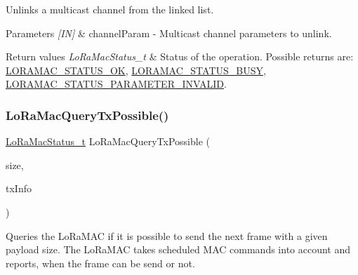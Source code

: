 Unlinks a multicast channel from the linked list.


\begin{DoxyParams}{Parameters}
{\em \mbox{[}\+I\+N\mbox{]}} & channel\+Param -\/ Multicast channel parameters to unlink.\\
\hline
\end{DoxyParams}

\begin{DoxyRetVals}{Return values}
{\em Lo\+Ra\+Mac\+Status\+\_\+t} & Status of the operation. Possible returns are\+: \hyperlink{group__LORAMAC_gga1d18f26b344040b3ec5c3db662919661a03db5fca052313edb3823c014b653a74}{L\+O\+R\+A\+M\+A\+C\+\_\+\+S\+T\+A\+T\+U\+S\+\_\+\+OK}, \hyperlink{group__LORAMAC_gga1d18f26b344040b3ec5c3db662919661a66b12f569207eacd97ee1c1d6c4cee6d}{L\+O\+R\+A\+M\+A\+C\+\_\+\+S\+T\+A\+T\+U\+S\+\_\+\+B\+U\+SY}, \hyperlink{group__LORAMAC_gga1d18f26b344040b3ec5c3db662919661ad0d3119f247d00e1787dda106fcb3017}{L\+O\+R\+A\+M\+A\+C\+\_\+\+S\+T\+A\+T\+U\+S\+\_\+\+P\+A\+R\+A\+M\+E\+T\+E\+R\+\_\+\+I\+N\+V\+A\+L\+ID}. \\
\hline
\end{DoxyRetVals}
\mbox{\label{group__LORAMAC_ga8b0aeaf75f9404ce01da9b202252c231}} 
\subsubsection{\texorpdfstring{Lo\+Ra\+Mac\+Query\+Tx\+Possible()}{LoRaMacQueryTxPossible()}}
{\footnotesize\ttfamily \hyperlink{group__LORAMAC_ga30bd25657e10480f8605ee951b0ecfbd}{Lo\+Ra\+Mac\+Status\+\_\+t} Lo\+Ra\+Mac\+Query\+Tx\+Possible (\begin{DoxyParamCaption}\item[{uint8\+\_\+t}]{size,  }\item[{\hyperlink{group__LORAMAC_ga3219fea2f3c3355f80d2ed29db613683}{Lo\+Ra\+Mac\+Tx\+Info\+\_\+t} $\ast$}]{tx\+Info }\end{DoxyParamCaption})}



Queries the Lo\+Ra\+M\+AC if it is possible to send the next frame with a given payload size. The Lo\+Ra\+M\+AC takes scheduled M\+AC commands into account and reports, when the frame can be send or not. 


